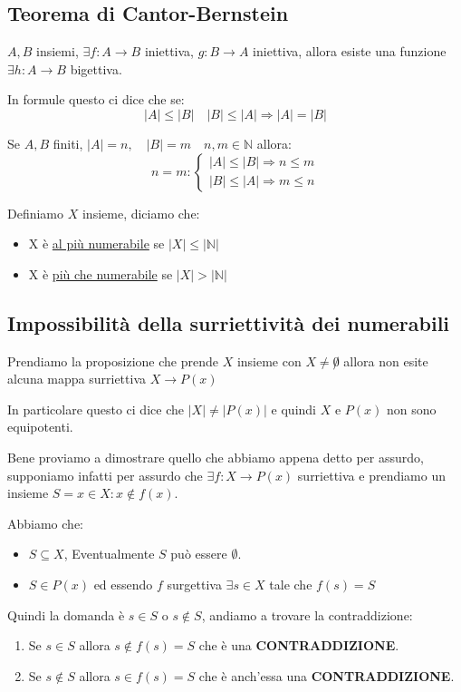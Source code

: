 \documentclass{article}
\theoremstyle{definition}
\begin{document}
\subsection{Teorema di Cantor-Bernstein}\label{sec:teorema_di_cantor}
\begin{tcolorbox}
        
$A,B$ insiemi, $\exists f : A \to B$ iniettiva, $g: B \to A$ iniettiva, allora esiste una funzione $\exists h: A \to B$ bigettiva. \par
In formule questo ci dice che se:
\begin{equation*}
        |A| \le |B| \quad |B| \le |A| \Rightarrow |A| = |B|
\end{equation*} \newline

Se $A,B$ finiti, $|A| = n, \quad |B|= m \quad n,m \in \mathbb{N}$ allora: 
\[n=m :
\begin{cases}
        |A| \le |B| \Rightarrow n \le m \\
        |B| \le |A| \Rightarrow m \le n
\end{cases}
\]


Definiamo $X$ insieme, diciamo che:
\begin{itemize}
        \item X è \underline{al più numerabile} se $|X| \le |\mathbb{N}|$	
        \item X è \underline{più che numerabile} se $|X| > |\mathbb{N}|$
\end{itemize}
\end{tcolorbox}



\subsection{Impossibilità della surriettività dei numerabili}
Prendiamo la proposizione che prende $X$ insieme con $X \not =  \not 0$ allora non esite alcuna mappa surriettiva $X \to P(x)$ \par
In particolare questo ci dice che $|X| \not = |P(x)|$ e quindi $X$ e $P(x)$ non sono equipotenti.

Bene proviamo a dimostrare quello che abbiamo appena detto per assurdo, supponiamo infatti per assurdo che $\exists f : X \to P(x)$ surriettiva e prendiamo un insieme $S = {x \in X : x \not \in f(x)}$. \par 
Abbiamo che:
\begin{itemize}
        \item $S \subseteq X$, Eventualmente $S$ può essere $\emptyset$.
        \item $S \in P(x)$ ed essendo $f$ surgettiva $\exists s \in X$ tale che $f(s) = S$ 
\end{itemize}
Quindi la domanda è $s \in S$ o $s \not \in S$, andiamo a trovare la contraddizione:
\begin{enumerate}
        \item Se $s \in S$ allora $s \not \in f(s) = S$ che è una \textbf{CONTRADDIZIONE}.
        \item Se $s \not \in S$ allora $s \in f(s) = S$ che è anch'essa una \textbf{CONTRADDIZIONE}.
\end{enumerate}
\end{document}
